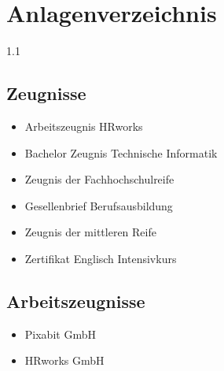 \documentclass[12pt,parskip=half-]{scrartcl}
\begin{document}

\section{Anlagenverzeichnis}

\begin{spacing}{1.1}
   

    \subsection{Zeugnisse}
    \begin{itemize}
    	\item Arbeitszeugnis HRworks
        \item Bachelor Zeugnis Technische Informatik
        \item Zeugnis der Fachhochschulreife
        \item Gesellenbrief Berufsausbildung
        \item Zeugnis der mittleren Reife
        \item Zertifikat Englisch Intensivkurs
    \end{itemize}
\Abstand
 \subsection{Arbeitszeugnisse}
\begin{itemize}
	\item Pixabit GmbH
	\item HRworks GmbH
\end{itemize}

\end{spacing}
\clearpage


 


 
 
 
 
 
 
 
 
 
\end{document}
